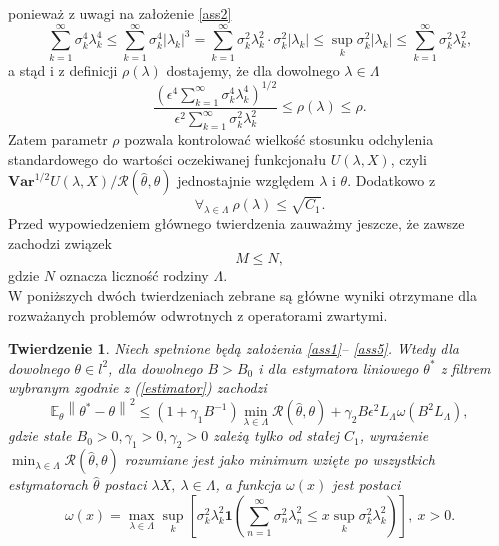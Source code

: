 \documentclass[man,mfiu]{mgrwms}
\newcommand{\norm}[1]{\left\lVert#1\right\rVert}
\newtheorem{tw}{Twierdzenie}[chapter]
\begin{document}
ponieważ z uwagi na założenie \ref{ass2}
\begin{displaymath}
\sum_{k=1}^{\infty}\sigma_k^4\lambda_k^4\leq \sum_{k=1}^{\infty}\sigma_k^4|\lambda_k|^3=\sum_{k=1}^{\infty}\sigma_k^2\lambda_k^2\cdot \sigma_k^2|\lambda_k|\leq \sup_k\sigma_k^2|\lambda_k|\leq\sum_{k=1}^{\infty}\sigma_k^2\lambda_k^2,
\end{displaymath}
a stąd i z definicji $\rho(\lambda)$ dostajemy, że dla dowolnego $\lambda\in \Lambda$
\begin{displaymath}
\frac{\left(\epsilon^4\sum_{k=1}^{\infty}\sigma_k^4\lambda_k^4\right)^{1/2}}{\epsilon^2\sum_{k=1}^{\infty}\sigma_k^2\lambda_k^2}\leq \rho(\lambda)\leq\rho.
\end{displaymath}
Zatem parametr $\rho$ pozwala kontrolować wielkość stosunku odchylenia standardowego do wartości oczekiwanej funkcjonału $U(\lambda,X)$, czyli $\textbf{Var}^{1/2}U(\lambda,X)/\mathcal{R}(\hat{\theta},\theta)$ jednostajnie względem $\lambda$ i $\theta$. Dodatkowo z 
\begin{displaymath}
\forall_{\lambda\in \Lambda}\ \rho(\lambda)\leq \sqrt{C_1}.
\end{displaymath}
Przed wypowiedzeniem głównego twierdzenia zauważmy jeszcze, że zawsze zachodzi związek
\begin{displaymath}
M\leq N,
\end{displaymath}
gdzie $N$ oznacza liczność rodziny $\Lambda$.\\
\indent W poniższych dwóch twierdzeniach zebrane są główne wyniki otrzymane dla rozważanych problemów odwrotnych z operatorami zwartymi.
\begin{tw}\label{glowny1}
Niech spełnione będą założenia \ref{ass1}-- \ref{ass5}. Wtedy dla dowolnego $\theta\in l^2$, dla dowolnego $B>B_0$ i dla estymatora liniowego $\theta^*$ z filtrem wybranym zgodnie z (\ref{estimator}) zachodzi
\begin{displaymath}
\mathbb{E}_{\theta}\norm{\theta^*-\theta}^2\leq (1+\gamma_1B^{-1})\min_{\lambda\in \Lambda}\mathcal{R}(\hat{\theta},\theta)+\gamma_2B\epsilon^2L_{\Lambda}\omega(B^2L_{\Lambda}),
\end{displaymath}
gdzie stałe $B_0>0,\gamma_1>0,\gamma_2>0$ zależą tylko od stałej $C_1$, wyrażenie $\min_{\lambda\in \Lambda}\mathcal{R}(\hat{\theta},\theta)$ rozumiane jest jako minimum wzięte po wszystkich estymatorach $\hat{\theta}$ postaci $\lambda X,\ \lambda\in \Lambda$, a funkcja $\omega(x)$ jest postaci
\begin{displaymath}
\omega(x)=\max_{\lambda\in \Lambda}\sup_k\left[\sigma_k^2\lambda_k^2\pmb{1}\left(\sum_{n=1}^{\infty}\sigma_n^2\lambda_n^2\leq x \sup_k\sigma_k^2\lambda_k^2\right)\right],\ x>0.
\end{displaymath}
\end{tw}
\end{document}
